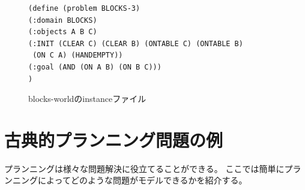 \begin{figure}
\lstset{language=pddl,basicstyle=\ttfamily\footnotesize,breaklines=true}
\begin{lstlisting}
(define (problem BLOCKS-3)
(:domain BLOCKS)
(:objects A B C)
(:INIT (CLEAR C) (CLEAR B) (ONTABLE C) (ONTABLE B)
 (ON C A) (HANDEMPTY))
(:goal (AND (ON A B) (ON B C)))
)

\end{lstlisting}
\caption{blocks-worldのinstanceファイル}
\label{fig:pddl-instance}
\end{figure}

\section{古典的プランニング問題の例}
\label{sec:classical-planning-example}

プランニングは様々な問題解決に役立てることができる。
ここでは簡単にプランニングによってどのような問題がモデルできるかを紹介する。

